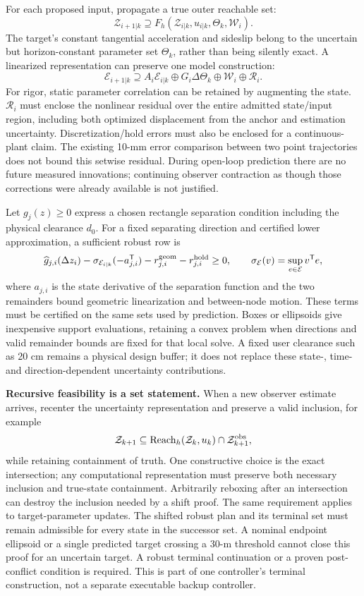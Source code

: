 \documentclass[10pt]{article}
\begin{document}
For each proposed input, propagate a true outer reachable set:
\[
 \mathcal Z_{i+1|k}\supseteq
 F_h(\mathcal Z_{i|k},u_{i|k},\Theta_k,\mathcal W_i).
\]
The target's constant tangential acceleration and sideslip belong to the
uncertain but horizon-constant parameter set $\Theta_k$, rather than being
silently exact. A linearized representation can preserve one model construction:
\[
 \mathcal E_{i+1|k}\supseteq
 A_i\mathcal E_{i|k}\oplus G_i\Delta\Theta_k
 \oplus\mathcal W_i\oplus\mathcal R_i.
\]
For rigor, static parameter correlation can be retained by augmenting the state.
$\mathcal R_i$ must enclose the nonlinear residual over the entire admitted
state/input region, including both optimized displacement from the anchor and
estimation uncertainty. Discretization/hold errors must also be enclosed for a
continuous-plant claim. The existing 10-mm error comparison between two point
trajectories does not bound this setwise residual. During open-loop prediction
there are no future measured innovations; continuing observer contraction as
though those corrections were already available is not justified.

Let $g_j(z)\ge0$ express a chosen rectangle separation condition including the
physical clearance $d_0$. For a fixed separating direction and certified lower
approximation, a sufficient robust row is
\[
 \widehat g_{j,i}(\Delta z_i)
 -\sigma_{\mathcal E_{i|k}}(-a_{j,i}^{\mathsf T})
 -r_{j,i}^{\rm geom}-r_{j,i}^{\rm hold}\ge0,
 \qquad \sigma_{\mathcal E}(v)=\sup_{e\in\mathcal E}v^{\mathsf T}e,
\]
where $a_{j,i}$ is the state derivative of the separation function and the two
remainders bound geometric linearization and between-node motion. These terms
must be certified on the same sets used by prediction. Boxes or ellipsoids give
inexpensive support evaluations, retaining a convex problem when directions and
valid remainder bounds are fixed for that local solve. A fixed user clearance
such as 20 cm remains a physical design buffer; it does not replace these
state-, time- and direction-dependent uncertainty contributions.

\textbf{Recursive feasibility is a set statement.} When a new observer estimate
arrives, recenter the uncertainty representation and preserve a valid inclusion,
for example
\[
 \mathcal Z_{k+1}\subseteq
 \operatorname{Reach}_h(\mathcal Z_k,u_k)\cap
 \mathcal Z^{\rm obs}_{k+1},
\]
while retaining containment of truth. One constructive choice is the exact
intersection; any computational representation must preserve both necessary
inclusion and true-state containment. Arbitrarily reboxing after an intersection
can destroy the inclusion needed by a shift proof. The same requirement applies
to target-parameter updates. The shifted robust plan and its terminal set must
remain admissible for every state in the successor set. A nominal endpoint
ellipsoid or a single predicted target crossing a 30-m threshold cannot close
this proof for an uncertain target. A robust terminal continuation or a proven
post-conflict condition is required. This is part of one controller's terminal
construction, not a separate executable backup controller.
\end{document}

